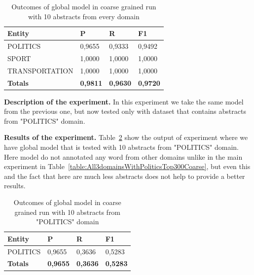 \documentclass[thesis=M,english]{FITthesis}[2018/05/30]
\begin{document}
	\begin{table}[H]\centering
		\begin{tabular}{|l|l|l|l|}
			\hline {\textbf{Entity}} & {\textbf{P}} & {\textbf{R}} & {\textbf{F1}}\\\hline
				POLITICS & 0,9655 & 0,9333 & 0,9492\\
				SPORT & 1,0000 & 1,0000 & 1,0000\\
				TRANSPORTATION & 1,0000 & 1,0000 & 1,0000\\\hline
				\textbf{Totals} & \textbf{0,9811} & \textbf{0,9630} & \textbf{0,9720}\\\hline
		\end{tabular}
	\caption{Outcomes of global model in coarse grained run with 10 abstracts from every domain \label{table:GlobalDomainWithAllAbstractsTop10Coarse}}
	\end{table}

	\textbf{Description of the experiment.} In this experiment we take the same model from the previous one, but now tested only with dataset that contains abstracts from "POLITICS" domain.
	
	\textbf{Results of the experiment.} Table~\ref{table:GlobalDomainWithPoliticsTop10Coarse} show the output of experiment where we have global model that is tested with 10 abstracts from "POLITICS" domain. Here model do not annotated any word from other domains unlike in the main experiment in Table~\ref{table:All3domainsWithPoliticsTop300Coarse}, but even this and the fact that here are much less abstracts does not help to provide a better results.
	
	\begin{table}[H]\centering
		\begin{tabular}{|l|l|l|l|}
			\hline {\textbf{Entity}} & {\textbf{P}} & {\textbf{R}} & {\textbf{F1}}\\\hline
				POLITICS & 0,9655 & 0,3636 & 0,5283\\\hline
				\textbf{Totals} & \textbf{0,9655} & \textbf{0,3636} & \textbf{0,5283}\\\hline
		\end{tabular}
		\caption{Outcomes of global model in coarse grained run with 10 abstracts from "POLITICS" domain \label{table:GlobalDomainWithPoliticsTop10Coarse}}
	\end{table}
\end{document}
